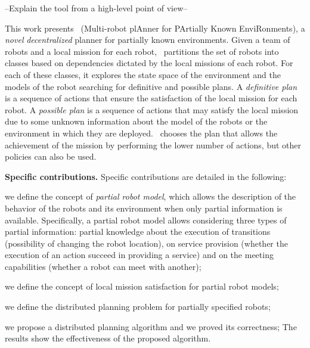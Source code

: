 --Explain the tool from a high-level point of view--

This work presents  \toolName\ (Multi-robot plAnner for PArtially Known EnviRonments), a \emph{novel} \emph{decentralized} planner for partially known environments.
Given a team of robots and a local mission for each robot, \toolName\ partitions the set of robots into classes based on dependencies dictated by the local missions of each robot.
For each of these classes, it explores the state space of the environment and the models of the robot searching for definitive and possible plans.
A \emph{definitive plan} is a sequence of actions that ensure the satisfaction of the local mission for each robot.
A \emph{possible plan} is a sequence of actions that may satisfy the local mission due to some unknown information about the model of the robots or the environment in which they are deployed.
\toolName\ chooses the plan that allows the achievement of the mission by performing the lower number of actions, but other policies can also be used.


\textbf{Specific contributions.} Specific contributions are detailed in the following:
\begin{enumerate*}
\item we define the concept of \emph{partial robot model}, which allows the description of the behavior of the robots and its environment when only partial information is available. 
Specifically, a partial robot model allows considering three types of partial information: partial knowledge about the execution of transitions (possibility of changing the robot location), on service provision (whether the execution of an action succeed in providing a service) and on the meeting capabilities (whether a robot can meet with another);
\item we define the concept of local mission satisfaction for partial robot models;
\item we define the distributed planning problem for partially specified robots;
\item we propose a distributed planning algorithm and we proved its correctness;
The results show the effectiveness of the proposed algorithm.
\end{enumerate*}


